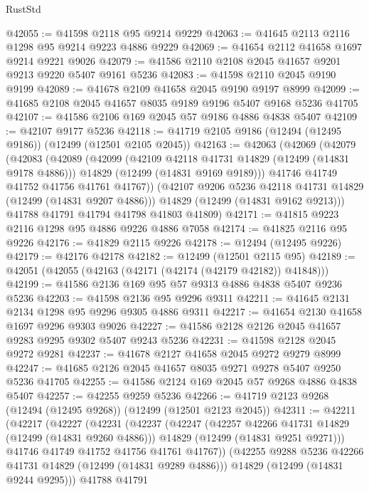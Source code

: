 \begin{lexlean}{RustStd}
\begin{coremodule}
{\begin{coremodule}
{{{{{{{{{{{{{{{{{{{{{{{{{{{{{{{{{{{{{{{{{{{{{{{{{{{{{{{{{{{{{{{{{{{{{{{{{{{{{{{{@42055 := @41598 @2118 @95 @9214 @9229
@42063 := @41645 @2113 @2116 @1298 @95 @9214 @9223 @4886 @9229
@42069 := @41654 @2112 @41658 @1697 @9214 @9221 @9026
@42079 := @41586 @2110 @2108 @2045 @41657 @9201 @9213 @9220 @5407 @9161 @5236
@42083 := @41598 @2110 @2045 @9190 @9199
@42089 := @41678 @2109 @41658 @2045 @9190 @9197 @8999
@42099 := @41685 @2108 @2045 @41657 @8035 @9189 @9196 @5407 @9168 @5236 @41705
@42107 := @41586 @2106 @169 @2045 @57 @9186 @4886 @4838 @5407
@42109 := @42107 @9177 @5236
@42118 := @41719 @2105 @9186 (@12494 (@12495 @9186)) (@12499 (@12501 @2105 @2045))
@42163 := @42063
    (@42069
      (@42079
        (@42083
          (@42089
            (@42099
              (@42109 @42118 @41731 @14829 (@12499 (@14831 @9178 @4886)))
              @14829
              (@12499 (@14831 @9169 @9189)))
            @41746
            @41749
            @41752
            @41756
            @41761
            @41767))
        (@42107 @9206 @5236 @42118 @41731 @14829 (@12499 (@14831 @9207 @4886)))
        @14829
        (@12499 (@14831 @9162 @9213)))
      @41788
      @41791
      @41794
      @41798
      @41803
      @41809)
@42171 := @41815 @9223 @2116 @1298 @95 @4886 @9226 @4886 @7058
@42174 := @41825 @2116 @95 @9226
@42176 := @41829 @2115 @9226
@42178 := @12494 (@12495 @9226)
@42179 := @42176 @42178
@42182 := @12499 (@12501 @2115 @95)
@42189 := @42051 (@42055 (@42163 (@42171 (@42174 (@42179 @42182)) @41848)))
@42199 := @41586 @2136 @169 @95 @57 @9313 @4886 @4838 @5407 @9236 @5236
@42203 := @41598 @2136 @95 @9296 @9311
@42211 := @41645 @2131 @2134 @1298 @95 @9296 @9305 @4886 @9311
@42217 := @41654 @2130 @41658 @1697 @9296 @9303 @9026
@42227 := @41586 @2128 @2126 @2045 @41657 @9283 @9295 @9302 @5407 @9243 @5236
@42231 := @41598 @2128 @2045 @9272 @9281
@42237 := @41678 @2127 @41658 @2045 @9272 @9279 @8999
@42247 := @41685 @2126 @2045 @41657 @8035 @9271 @9278 @5407 @9250 @5236 @41705
@42255 := @41586 @2124 @169 @2045 @57 @9268 @4886 @4838 @5407
@42257 := @42255 @9259 @5236
@42266 := @41719 @2123 @9268 (@12494 (@12495 @9268)) (@12499 (@12501 @2123 @2045))
@42311 := @42211
    (@42217
      (@42227
        (@42231
          (@42237
            (@42247
              (@42257 @42266 @41731 @14829 (@12499 (@14831 @9260 @4886)))
              @14829
              (@12499 (@14831 @9251 @9271)))
            @41746
            @41749
            @41752
            @41756
            @41761
            @41767))
        (@42255 @9288 @5236 @42266 @41731 @14829 (@12499 (@14831 @9289 @4886)))
        @14829
        (@12499 (@14831 @9244 @9295)))
      @41788
      @41791
}}}}}}}}}}}}}}}}}}}}}}}}}}}}}}}}}}}}}}}}}}}}}}}}}}}}}}}}}}}}}}}}}}}}}}}}}}}}}}}}
\end{coremodule}}
\end{coremodule}
\end{lexlean}
